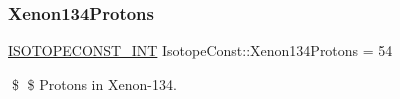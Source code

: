 \subsubsection{\texorpdfstring{Xenon134\+Protons}{Xenon134Protons}}
{\footnotesize\ttfamily \mbox{\hyperlink{group___isotope_const-_macros_ga5f18360b3e99483a35c32d789e62621c}{I\+S\+O\+T\+O\+P\+E\+C\+O\+N\+S\+T\+\_\+\+I\+NT}} Isotope\+Const\+::\+Xenon134\+Protons = 54}

\$ \$ Protons in Xenon-\/134. 